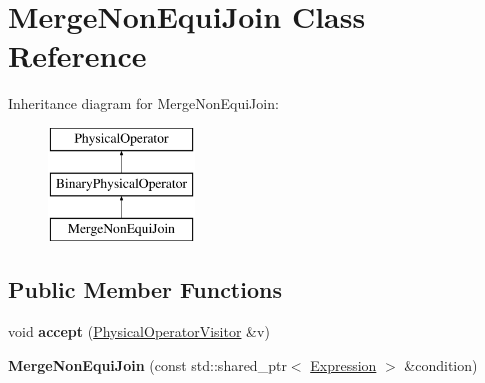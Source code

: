 \hypertarget{class_merge_non_equi_join}{\section{Merge\+Non\+Equi\+Join Class Reference}
\label{class_merge_non_equi_join}
}
Inheritance diagram for Merge\+Non\+Equi\+Join\+:\begin{figure}[H]
\begin{center}
\leavevmode
\includegraphics[height=3.000000cm]{class_merge_non_equi_join}
\end{center}
\end{figure}
\subsection*{Public Member Functions}
\begin{DoxyCompactItemize}
\item 
\hypertarget{class_merge_non_equi_join_a117ec79e9941977b4f90c65bea5cea65}{void {\bfseries accept} (\hyperlink{class_physical_operator_visitor}{Physical\+Operator\+Visitor} \&v)}\label{class_merge_non_equi_join_a117ec79e9941977b4f90c65bea5cea65}

\item 
\hypertarget{class_merge_non_equi_join_a3e7a12e0e21a2bf755608c9bc2e5d4ed}{{\bfseries Merge\+Non\+Equi\+Join} (const std\+::shared\+\_\+ptr$<$ \hyperlink{class_expression}{Expression} $>$ \&condition)}\label{class_merge_non_equi_join_a3e7a12e0e21a2bf755608c9bc2e5d4ed}

\end{DoxyCompactItemize}
